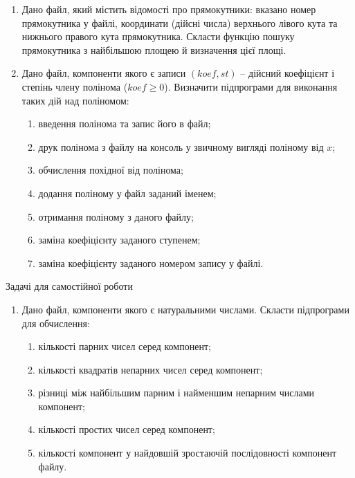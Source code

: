 \documentclass[]{article}
\makeatletter
\newcommand{\xslalph}[1]{\expandafter\@xslalph\csname c@#1\endcsname}
\newcommand{\@xslalph}[1]{%
    \ifcase#1\or а\or б\or в\or г\or д\or e\or є\or ж\or з\or i%
    \or й\or к\or л\or м\or н\or о\or п\or р\or с\or т%
    \or у\or ф\or х\or ц\or ч\or ш\or ю\or я\or аа\or бб\or вв%
    \else\@ctrerr\fi%
}
\makeatother
\begin{document}
\begin{enumerate}
\begin{enumerate}[label=\xslalph*)]
\begin{enumerate}
\begin{enumerate}[label=\xslalph*)]
\begin{enumerate}
\item
  Дано файл, який містить відомості про прямокутники: вказано номер
  прямокутника у файлі, координати (дійсні числа) верхнього лівого кута та
  нижнього правого кута прямокутника. Скласти функцію пошуку
  прямокутника з найбільшою площею й визначення цієї площі.
\item
  Дано файл, компоненти якого є записи $(koef, st)$ -- дійсний коефіцієнт
  і степінь члену полінома ($koef \ge 0$). Визначити підпрограми для
  виконання таких дій над поліномом:

\begin{enumerate}[label=\xslalph*)]
\item
введення полінома та запис його в файл; 
\item
друк полінома з файлу на консоль у звичному вигляді поліному від $x$;
\item
обчислення похідної від полінома;
\item
додання поліному у файл заданий іменем;
\item
отримання поліному з даного файлу;
\item
заміна коефіцієнту заданого ступенем;
\item
заміна коефіцієнту заданого номером запису у файлі.
\end{enumerate}

\end{enumerate}


Задачі для самостійної роботи

\begin{enumerate}
\def\labelenumi{\arabic{enumi})}
\setcounter{enumi}{4}
\item
  Дано файл, компоненти якого є натуральними числами. Скласти
  підпрограми для обчислення:
\begin{enumerate}[label=\xslalph*)]
\item
кількості парних чисел серед компонент;
\item
кількості квадратів непарних чисел серед компонент;
\item
різниці між найбільшим парним і найменшим непарним числами компонент;
\item
кількості простих чисел серед компонент;
\item  
кількості компонент у найдовшій зростаючій послідовності компонент
файлу.
\end{enumerate}


\end{enumerate}
\end{enumerate}
\end{enumerate}
\end{enumerate}
\end{enumerate}
\end{document}
